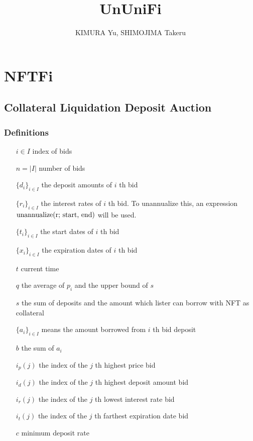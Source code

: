 \documentclass[dvipdfmx]{jsarticle}
\title{UnUniFi}
\author{KIMURA Yu, SHIMOJIMA Takeru}
\begin{document}

\maketitle

\section{NFTFi}

\subsection{Collateral Liquidation Deposit Auction}

\subsubsection{Definitions}

\begin{itemize}
  \item[$i \in I$] index of bids
  \item[$n = |I|$] number of bids
  \item[$\{d_i\}_{i \in I}$] the deposit amounts of $i$ th bid
  \item[$\{r_i\}_{i \in I}$] the interest rates of $i$ th bid. To unannualize this, an expression $\text{unannualize(r; \text{start}, \text{end})}$ will be used.
  \item[$\{t_i\}_{i \in I}$] the start dates of $i$ th bid
  \item[$\{x_i\}_{i \in I}$] the expiration dates of $i$ th bid
  \item[$t$] current time 
  \item[$q$] the average of $p_i$ and the upper bound of $s$
  \item[$s$] the sum of deposits and the amount which lister can borrow with NFT as collateral
  \item[$\{a_i\}_{i \in I}$] means the amount borrowed from $i$ th bid deposit
  \item[$b$] the sum of $a_i$
  \item[$i_p(j)$] the index of the $j$ th highest price bid
  \item[$i_d(j)$] the index of the $j$ th highest deposit amount bid
  \item[$i_r(j)$] the index of the $j$ th lowest interest rate bid
  \item[$i_t(j)$] the index of the $j$ th farthest expiration date bid
  \item[$c$] minimum deposit rate
\end{itemize}
\end{document}
